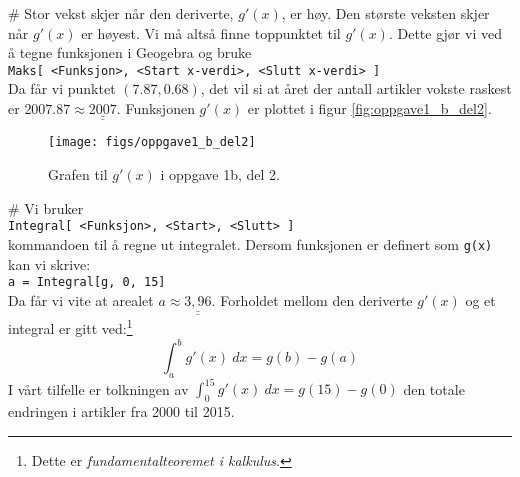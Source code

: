 \documentclass[12pt, a4paper]
{article}						%
\def\answer#1{\underline{\underline{#1}}}
\newcommand{\figwidth}{0.75}
\begin{document}
\begin{easylist}[enumerate]
	# Stor vekst skjer når den deriverte, $g'(x)$, er høy.
	Den største veksten skjer når $g'(x)$ er høyest. 
	Vi må altså finne toppunktet til $g'(x)$.
	Dette gjør vi ved å tegne funksjonen i Geogebra og bruke \\
	\texttt{Maks[ <Funksjon>, <Start x-verdi>, <Slutt x-verdi> ]}\\ 
	Da får vi punktet $(7.87, 0.68)$, det vil si at året der antall artikler vokste raskest er $2007.87 \approx \answer{2007}$. Funksjonen $g'(x)$ er plottet i figur \eqref{fig:oppgave1_b_del2}.
	\begin{figure}[th!]
		\centering
		\texttt{[image: figs/oppgave1\_b\_del2]}
		\caption{Grafen til $g'(x)$ i oppgave 1b, del 2.}
		\label{fig:oppgave1_b_del2}
	\end{figure}

	# Vi bruker \\
	\texttt{Integral[ <Funksjon>, <Start>, <Slutt> ]}\\
	kommandoen til å regne ut integralet. Dersom funksjonen er definert som \texttt{g(x)} kan vi skrive: \\
	\texttt{a = Integral[g, 0, 15]} \\
	Da får vi vite at arealet $a \approx \answer{3,96}$. Forholdet mellom den deriverte $g'(x)$ og et integral er gitt ved:\footnote{Dette er \emph{fundamentalteoremet i kalkulus}.}
	\begin{equation*}
		\int_{a}^{b} g'(x) \ dx = g(b) - g(a)
	\end{equation*}
	I vårt tilfelle er tolkningen av $\int_{0}^{15} g'(x) \ dx = g(15) - g(0)$ den totale endringen i artikler fra 2000 til 2015.
	


\end{easylist}
\end{document}
